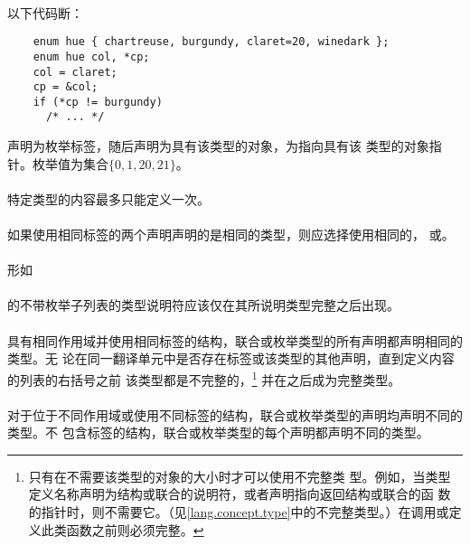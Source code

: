 {\paragraph{}
\ex* 以下代码断：
\begin{lstlisting}
    enum hue { chartreuse, burgundy, claret=20, winedark };
    enum hue col, *cp;
    col = claret;
    cp = &col;
    if (*cp != burgundy)
      /* ... */
\end{lstlisting}
声明为枚举标签，随后声明为具有该类型的对象，为指向具有该
类型的对象指针。枚举值为集合$\{0, 1, 20, 21\}$。


\constraint
\paragraph{}
特定类型的内容最多只能定义一次。

\paragraph{}
如果使用相同标签的两个声明声明的是相同的类型，则应选择使用相同的，
或。

\paragraph{}
形如                                                                          \\
\mbox{\hspace{4em} }                                  \\
的不带枚举子列表的类型说明符应该仅在其所说明类型完整之后出现。

\semantic
\paragraph{}
具有相同作用域并使用相同标签的结构，联合或枚举类型的所有声明都声明相同的类型。无
论在同一翻译单元中是否存在标签或该类型的其他声明，直到定义内容的列表的右括号之前
该类型都是不完整的，\footnote{只有在不需要该类型的对象的大小时才可以使用不完整类
型。例如，当类型定义名称声明为结构或联合的说明符，或者声明指向返回结构或联合的函
数的指针时，则不需要它。（见\ref{lang.concept.type}中的不完整类型。）在调用或定
义此类函数之前则必须完整。} 并在之后成为完整类型。

\paragraph{}
对于位于不同作用域或使用不同标签的结构，联合或枚举类型的声明均声明不同的类型。不
包含标签的结构，联合或枚举类型的每个声明都声明不同的类型。

}
